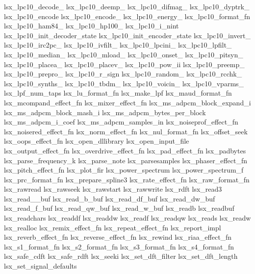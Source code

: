 lsx\+\_\+lpc10\+\_\+decode\+\_\+ lsx\+\_\+lpc10\+\_\+deemp\+\_\+ lsx\+\_\+lpc10\+\_\+difmag\+\_\+ lsx\+\_\+lpc10\+\_\+dyptrk\+\_\+ lsx\+\_\+lpc10\+\_\+encode lsx\+\_\+lpc10\+\_\+encode\+\_\+ lsx\+\_\+lpc10\+\_\+energy\+\_\+ lsx\+\_\+lpc10\+\_\+format\+\_\+fn lsx\+\_\+lpc10\+\_\+ham84\+\_\+ lsx\+\_\+lpc10\+\_\+hp100\+\_\+ lsx\+\_\+lpc10\+\_\+i\+\_\+nint lsx\+\_\+lpc10\+\_\+init\+\_\+decoder\+\_\+state lsx\+\_\+lpc10\+\_\+init\+\_\+encoder\+\_\+state lsx\+\_\+lpc10\+\_\+invert\+\_\+ lsx\+\_\+lpc10\+\_\+irc2pc\+\_\+ lsx\+\_\+lpc10\+\_\+ivfilt\+\_\+ lsx\+\_\+lpc10\+\_\+lpcini\+\_\+ lsx\+\_\+lpc10\+\_\+lpfilt\+\_\+ lsx\+\_\+lpc10\+\_\+median\+\_\+ lsx\+\_\+lpc10\+\_\+mload\+\_\+ lsx\+\_\+lpc10\+\_\+onset\+\_\+ lsx\+\_\+lpc10\+\_\+pitsyn\+\_\+ lsx\+\_\+lpc10\+\_\+placea\+\_\+ lsx\+\_\+lpc10\+\_\+placev\+\_\+ lsx\+\_\+lpc10\+\_\+pow\+\_\+ii lsx\+\_\+lpc10\+\_\+preemp\+\_\+ lsx\+\_\+lpc10\+\_\+prepro\+\_\+ lsx\+\_\+lpc10\+\_\+r\+\_\+sign lsx\+\_\+lpc10\+\_\+random\+\_\+ lsx\+\_\+lpc10\+\_\+rcchk\+\_\+ lsx\+\_\+lpc10\+\_\+synths\+\_\+ lsx\+\_\+lpc10\+\_\+tbdm\+\_\+ lsx\+\_\+lpc10\+\_\+voicin\+\_\+ lsx\+\_\+lpc10\+\_\+vparms\+\_\+ lsx\+\_\+lpf\+\_\+num\+\_\+taps lsx\+\_\+lu\+\_\+format\+\_\+fn lsx\+\_\+make\+\_\+lpf lsx\+\_\+maud\+\_\+format\+\_\+fn lsx\+\_\+mcompand\+\_\+effect\+\_\+fn lsx\+\_\+mixer\+\_\+effect\+\_\+fn lsx\+\_\+ms\+\_\+adpcm\+\_\+block\+\_\+expand\+\_\+i lsx\+\_\+ms\+\_\+adpcm\+\_\+block\+\_\+mash\+\_\+i lsx\+\_\+ms\+\_\+adpcm\+\_\+bytes\+\_\+per\+\_\+block lsx\+\_\+ms\+\_\+adpcm\+\_\+i\+\_\+coef lsx\+\_\+ms\+\_\+adpcm\+\_\+samples\+\_\+in lsx\+\_\+noiseprof\+\_\+effect\+\_\+fn lsx\+\_\+noisered\+\_\+effect\+\_\+fn lsx\+\_\+norm\+\_\+effect\+\_\+fn lsx\+\_\+nul\+\_\+format\+\_\+fn lsx\+\_\+offset\+\_\+seek lsx\+\_\+oops\+\_\+effect\+\_\+fn lsx\+\_\+open\+\_\+dllibrary lsx\+\_\+open\+\_\+input\+\_\+file lsx\+\_\+output\+\_\+effect\+\_\+fn lsx\+\_\+overdrive\+\_\+effect\+\_\+fn lsx\+\_\+pad\+\_\+effect\+\_\+fn lsx\+\_\+padbytes lsx\+\_\+parse\+\_\+frequency\+\_\+k lsx\+\_\+parse\+\_\+note lsx\+\_\+parsesamples lsx\+\_\+phaser\+\_\+effect\+\_\+fn lsx\+\_\+pitch\+\_\+effect\+\_\+fn lsx\+\_\+plot\+\_\+fir lsx\+\_\+power\+\_\+spectrum lsx\+\_\+power\+\_\+spectrum\+\_\+f lsx\+\_\+prc\+\_\+format\+\_\+fn lsx\+\_\+prepare\+\_\+spline3 lsx\+\_\+rate\+\_\+effect\+\_\+fn lsx\+\_\+raw\+\_\+format\+\_\+fn lsx\+\_\+rawread lsx\+\_\+rawseek lsx\+\_\+rawstart lsx\+\_\+rawwrite lsx\+\_\+rdft lsx\+\_\+read3 lsx\+\_\+read\+\_\+\_\+buf lsx\+\_\+read\+\_\+b\+\_\+buf lsx\+\_\+read\+\_\+df\+\_\+buf lsx\+\_\+read\+\_\+dw\+\_\+buf lsx\+\_\+read\+\_\+f\+\_\+buf lsx\+\_\+read\+\_\+qw\+\_\+buf lsx\+\_\+read\+\_\+w\+\_\+buf lsx\+\_\+readb lsx\+\_\+readbuf lsx\+\_\+readchars lsx\+\_\+readdf lsx\+\_\+readdw lsx\+\_\+readf lsx\+\_\+readqw lsx\+\_\+reads lsx\+\_\+readw lsx\+\_\+realloc lsx\+\_\+remix\+\_\+effect\+\_\+fn lsx\+\_\+repeat\+\_\+effect\+\_\+fn lsx\+\_\+report\+\_\+impl lsx\+\_\+reverb\+\_\+effect\+\_\+fn lsx\+\_\+reverse\+\_\+effect\+\_\+fn lsx\+\_\+rewind lsx\+\_\+riaa\+\_\+effect\+\_\+fn lsx\+\_\+s1\+\_\+format\+\_\+fn lsx\+\_\+s2\+\_\+format\+\_\+fn lsx\+\_\+s3\+\_\+format\+\_\+fn lsx\+\_\+s4\+\_\+format\+\_\+fn lsx\+\_\+safe\+\_\+cdft lsx\+\_\+safe\+\_\+rdft lsx\+\_\+seeki lsx\+\_\+set\+\_\+dft\+\_\+filter lsx\+\_\+set\+\_\+dft\+\_\+length lsx\+\_\+set\+\_\+signal\+\_\+defaults 